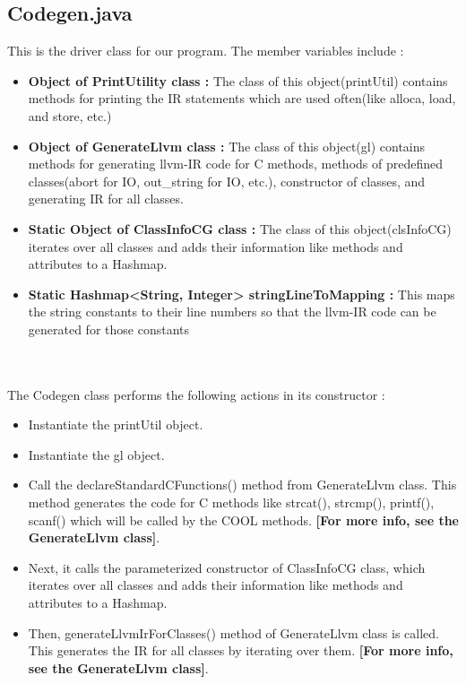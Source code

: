 \documentclass{article}
\begin{document}
\subsection{Codegen.java}
This is the driver class for our program. The member variables include : 
\begin{itemize}

    \item \textbf{Object of PrintUtility class :} The class of this object(printUtil) contains methods for printing the IR statements which are used often(like alloca, load, and store, etc.)
    \item \textbf{Object of GenerateLlvm class :} The class of this object(gl) contains methods for generating llvm-IR code for C methods, methods of predefined classes(abort for IO, out\_string for IO, etc.), constructor of classes, and generating IR for all classes.
    \item \textbf{Static Object of ClassInfoCG class :} The class of this object(clsInfoCG) iterates over all classes and adds their information like methods and attributes to a Hashmap.
    \item \textbf{Static Hashmap<String, Integer> stringLineToMapping :}  This maps the string constants to their line numbers so that the llvm-IR code can be generated for those constants
   
\end{itemize}
\\ \\
The Codegen class performs the following actions in its constructor : 
\begin{itemize}

    \item Instantiate the printUtil object.
    \item Instantiate the gl object.
    \item Call the declareStandardCFunctions() method from GenerateLlvm class. This method generates the code for C methods like strcat(), strcmp(), printf(), scanf() which will be called by the COOL methods. \textbf{[For more info, see the GenerateLlvm class]}.
    \item Next, it calls the parameterized constructor of ClassInfoCG class, which iterates over all classes and adds their information like methods and attributes to a Hashmap.
    \item Then, generateLlvmIrForClasses() method of GenerateLlvm class is called. This generates the IR for all classes by iterating over them. \textbf{[For more info, see the GenerateLlvm class]}.

\end{itemize}
\end{document}

